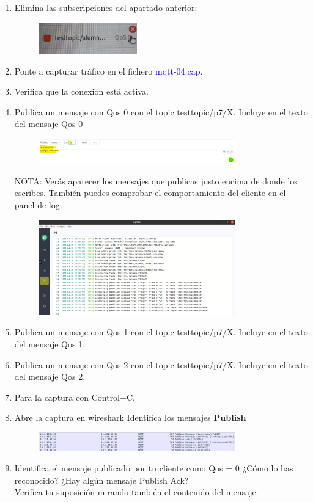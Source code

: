 \documentclass[12pt, a4paper]{report}
\begin{document}
\begin{enumerate}
	\item Elimina las subscripciones del apartado anterior:
	\begin{figure}[H]
		\centering
		\includegraphics[width=0.4\textwidth]{enun14}
	\end{figure}
	\item Ponte a capturar tráfico en el fichero \textcolor{blue}{mqtt-04.cap}.
	\item Verifica que la conexión está activa.
	\item Publica un mensaje con Qos 0 con el topic testtopic/p7/X. Incluye en el texto del mensaje
	Qos 0
	\begin{figure}[H]
		\centering
		\includegraphics[width=0.8\textwidth]{enun15}
	\end{figure}
	NOTA: Verás aparecer los mensajes que publicas justo encima de donde los escribes. También
	puedes comprobar el comportamiento del cliente en el panel de log:
	\begin{figure}[H]
		\centering
		\includegraphics[width=0.8\textwidth]{enun16}
	\end{figure}
	\item Publica un mensaje con Qos 1 con el topic testtopic/p7/X. Incluye en el texto del mensaje
	Qos 1.
	\item Publica un mensaje con Qos 2 con el topic testtopic/p7/X. Incluye en el texto del mensaje
	Qos 2.
	\item Para la captura con Control+C.
	\item Abre la captura en wireshark Identifica los mensajes \textbf{Publish}
	\begin{figure}[H]
		\centering
		\includegraphics[width=0.8\textwidth]{ej7.8}
	\end{figure}
	\item Identifica el mensaje publicado por tu cliente como Qos = 0 ¿Cómo lo has reconocido? ¿Hay
	algún mensaje Publish Ack?\\
	Verifica tu suposición mirando también el contenido del mensaje.\\
	

\end{enumerate}
\end{document}
